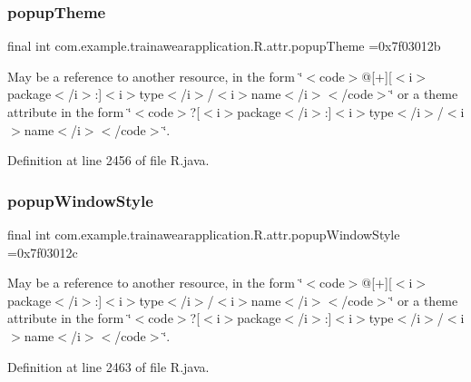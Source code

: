 \subsubsection{\texorpdfstring{popupTheme}{popupTheme}}
{\footnotesize\ttfamily final int com.\+example.\+trainawearapplication.\+R.\+attr.\+popup\+Theme =0x7f03012b\hspace{0.3cm}{\ttfamily [static]}}

May be a reference to another resource, in the form \char`\"{}$<$code$>$@\mbox{[}+\mbox{]}\mbox{[}$<$i$>$package$<$/i$>$\+:\mbox{]}$<$i$>$type$<$/i$>$/$<$i$>$name$<$/i$>$$<$/code$>$\char`\"{} or a theme attribute in the form \char`\"{}$<$code$>$?\mbox{[}$<$i$>$package$<$/i$>$\+:\mbox{]}$<$i$>$type$<$/i$>$/$<$i$>$name$<$/i$>$$<$/code$>$\char`\"{}. 

Definition at line 2456 of file R.\+java.

\mbox{\label{classcom_1_1example_1_1trainawearapplication_1_1_r_1_1attr_af46850c70a836bf4c9948db67a5e13e9}} 
\subsubsection{\texorpdfstring{popupWindowStyle}{popupWindowStyle}}
{\footnotesize\ttfamily final int com.\+example.\+trainawearapplication.\+R.\+attr.\+popup\+Window\+Style =0x7f03012c\hspace{0.3cm}{\ttfamily [static]}}

May be a reference to another resource, in the form \char`\"{}$<$code$>$@\mbox{[}+\mbox{]}\mbox{[}$<$i$>$package$<$/i$>$\+:\mbox{]}$<$i$>$type$<$/i$>$/$<$i$>$name$<$/i$>$$<$/code$>$\char`\"{} or a theme attribute in the form \char`\"{}$<$code$>$?\mbox{[}$<$i$>$package$<$/i$>$\+:\mbox{]}$<$i$>$type$<$/i$>$/$<$i$>$name$<$/i$>$$<$/code$>$\char`\"{}. 

Definition at line 2463 of file R.\+java.

\mbox{\label{classcom_1_1example_1_1trainawearapplication_1_1_r_1_1attr_aad6bae323d98d568dd9350c79ef4dc6a}} 
